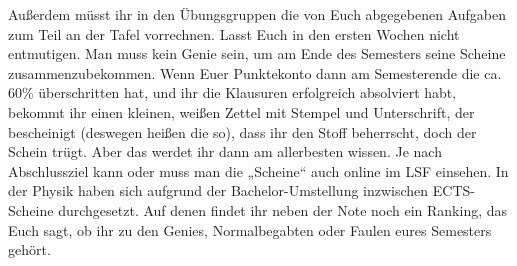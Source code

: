 Außerdem müsst ihr in den Übungsgruppen die von Euch abgegebenen
Aufgaben zum Teil an der Tafel vorrechnen. Lasst Euch in den ersten
Wochen nicht entmutigen. Man muss kein Genie sein, um am Ende des
Semesters seine Scheine zusammenzubekommen. Wenn Euer Punktekonto dann
am Semesterende die ca. 60\% überschritten hat, und ihr die Klausuren
erfolgreich absolviert habt, bekommt ihr einen kleinen, weißen Zettel
mit Stempel und Unterschrift, der bescheinigt (deswegen heißen die
so), dass ihr den Stoff beherrscht, doch der Schein trügt. Aber das
werdet ihr dann am allerbesten wissen. Je nach Abschlussziel kann oder muss man die „Scheine“ auch online im LSF
 einsehen. In der Physik haben sich
aufgrund der Bachelor-Umstellung inzwischen ECTS-Scheine
durchgesetzt. Auf denen findet ihr neben der Note noch ein Ranking,
das Euch sagt, ob ihr zu den Genies, Normalbegabten oder Faulen eures
Semesters gehört.
